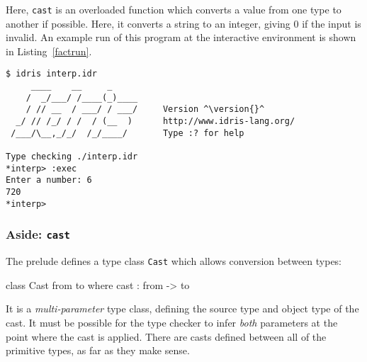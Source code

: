 \noindent
Here, \texttt{cast} is an overloaded function which converts a value from one type to another if possible.
Here, it converts a string to an integer, giving 0 if the input is invalid.
An example run of this program at the \Idris{} interactive environment is shown in Listing~\ref{factrun}.

\begin{lstlisting}[float=h,caption={Running the well-typed interpreter}, label=factrun, style=stdout]
$ idris interp.idr
     ____    __     _
    /  _/___/ /____(_)____
    / // __  / ___/ / ___/     Version ^\version{}^
  _/ // /_/ / /  / (__  )      http://www.idris-lang.org/
 /___/\__,_/_/  /_/____/       Type :? for help

Type checking ./interp.idr
*interp> :exec
Enter a number: 6
720
*interp>
\end{lstlisting}

\subsubsection*{Aside: \texttt{cast}}

The prelude defines a type class \texttt{Cast} which allows conversion between types:

\begin{code}
class Cast from to where
    cast : from -> to
\end{code}

\noindent
It is a \emph{multi-parameter} type class, defining the source type and object type of the cast.
It must be possible for the type checker to infer \emph{both} parameters at the point where the cast is applied.
There are casts defined between all of the primitive types, as far as they make sense.








